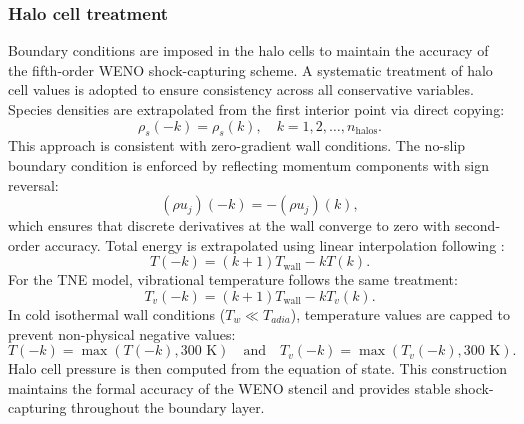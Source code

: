 \subsubsection{Halo cell treatment}\label{section:ghostcelltreatment}
Boundary conditions are imposed in the halo cells to maintain the accuracy of the fifth-order WENO shock-capturing scheme. A systematic treatment of halo cell values is adopted to ensure consistency across all conservative variables. Species densities are extrapolated from the first interior point via direct copying:
\begin{equation}
\rho_s(-k) = \rho_s(k), \quad k = 1, 2, \ldots, n_{\text{halos}}.
\end{equation}
This approach is consistent with zero-gradient wall conditions. The no-slip boundary condition is enforced by reflecting momentum components with sign reversal:
\begin{equation}
(\rho u_j)(-k) = -(\rho u_j)(k),
\end{equation}
which ensures that discrete derivatives at the wall converge to zero with second-order accuracy. Total energy is extrapolated using linear interpolation following \citet{Blazek2015}:
\begin{equation}
T(-k) = (k+1)T_{\text{wall}} - k T(k).
\end{equation}
For the \gls{TNE} model, vibrational temperature follows the same treatment:
\begin{equation}
T_v(-k) = (k+1)T_{\text{wall}} - k T_v(k).
\end{equation}
In cold isothermal wall conditions ($T_w \ll T_{adia}$), temperature values are capped to prevent non-physical negative values:
\begin{equation}
T(-k) = \max(T(-k), 300 \text{ K}) \quad \text{and} \quad T_v(-k) = \max(T_v(-k), 300 \text{ K}).
\end{equation}
Halo cell pressure is then computed from the equation of state. This construction maintains the formal accuracy of the WENO stencil and provides stable shock-capturing throughout the boundary layer.



